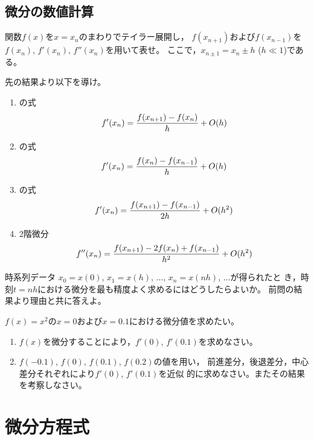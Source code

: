 \documentclass[twocolumn,11pt]{jarticle}
\begin{document}
\subsection{微分の数値計算}
\nquestion
関数$f(x)$を$x=x_n$のまわりでテイラー展開し，
  $f(x_{n+1})$および$f(x_{n-1})$を$f(x_n)$, $f'(x_n)$, $f''(x_n)$を用いて表せ。
  ここで，$x_{n\pm 1}=x_n\pm h$ ($h\ll 1$)である。

\nquestion
先の結果より以下を導け。
  \begin{enumerate}
  \item {}の式
    \begin{align}
      f'(x_n)=\frac{f(x_{n+1})-f(x_n)}{h}+O(h)\notag
    \end{align}
  \item {}の式
    \begin{align}
      f'(x_n)=\frac{f(x_{n})-f(x_{n-1})}{h}+O(h)\notag
    \end{align}
  \item {}の式
    \begin{align}
      f'(x_n)=\frac{f(x_{n+1})-f(x_{n-1})}{2h}+O(h^2)\notag
    \end{align}
  \item 2階微分
    \begin{align}
      f''(x_n)=\frac{f(x_{n+1})-2f(x_n)+f(x_{n-1})}{h^2}+O(h^2)\notag
    \end{align}
  \end{enumerate}

\nquestion
時系列データ
  $x_0=x(0)$, $x_1=x(h)$, $\ldots$, $x_n=x(nh)$, $\ldots$が得られたと
  き，時刻$t=nh$における微分を最も精度よく求めるにはどうしたらよいか。
  前問の結果より理由と共に答えよ。

\nquestion
$f(x)=x^2$の$x=0$および$x=0.1$における微分値を求めたい。
  \begin{enumerate}
  \item $f(x)$を微分することにより，$f'(0)$, $f'(0.1)$を求めなさい。
  \item $f(-0.1)$, $f(0)$, $f(0.1)$, $f(0.2)$の値を用い，
    前進差分，後退差分，中心差分それぞれにより$f'(0)$, $f'(0.1)$を近似
    的に求めなさい。またその結果を考察しなさい。
  \end{enumerate}

\section{微分方程式}
\end{document}
